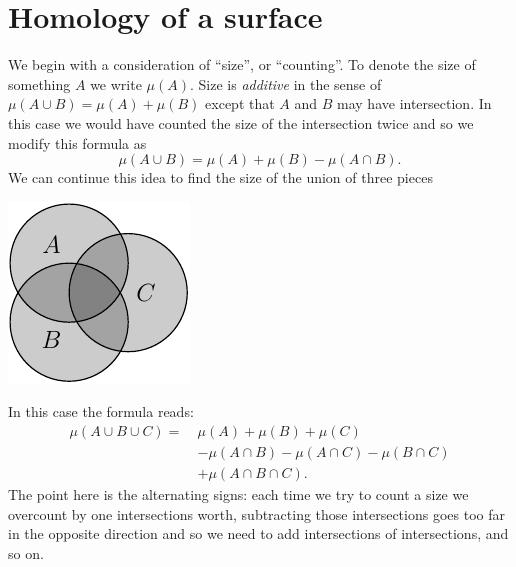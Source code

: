 \documentclass[11pt,oneside]{report}
\def\euler{\mu}
\begin{document}
\section{Homology of a surface}

We begin with a consideration of ``size'', or ``counting''.
To denote the size of something $A$ we write $\euler(A).$
Size is \emph{additive} in the sense of 
$\euler(A\cup B) = \euler(A) + \euler(B)$ except that
$A$ and $B$ may have intersection.
In this case we would have counted the 
size of the intersection twice and so we modify this formula as
$$
    \euler(A\cup B) = \euler(A) + \euler(B) - \euler(A\cap B).
$$
We can continue this idea to find the
size of the union of three pieces
\begin{center}
\includegraphics{pic-ABC.pdf}
\end{center}
In this case the formula reads:
\begin{align}\label{EulerAddSub}
\euler(A\cup B\cup C) = \ &\euler(A) + \euler(B) + \euler(C)  \nonumber \\
                     &- \euler(A\cap B) - \euler(A\cap C) - \euler(B\cap C) \nonumber \\
                     &+ \euler(A\cap B \cap C).
\end{align}
The point here is the alternating signs:
each time we try to count a size we overcount by
one intersections worth, subtracting those intersections
goes too far in the opposite direction and so we need
to add intersections of intersections, and so on.
\end{document}
